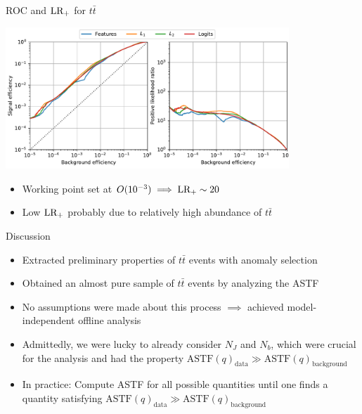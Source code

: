 \documentclass{beamer}
\begin{document}
\begin{frame}{ROC and $\textup{LR}_+$ for $t\bar{t}$}
\begin{center}
\includegraphics[width=0.8\textwidth]{roc-tt.pdf}
\end{center}
\begin{itemize}
    \item<1-> Working point set at $O(10^{-3}) \implies \textup{LR}_+ \sim 20$ 
    \item<2-> Low $\textup{LR}_+$ probably due to relatively high abundance of $t\bar{t}$
\end{itemize}
\end{frame}

\begin{frame}{Discussion}

\begin{itemize}
    \item<1-> Extracted preliminary properties of $t\bar{t}$ events with anomaly selection
    \item<2-> Obtained an almost pure sample of $t\bar{t}$ events by analyzing the ASTF
    \item<3-> No assumptions were made about this process $\implies$ achieved model-independent offline analysis
    \item<4-> Admittedly, we were lucky to already consider $N_J$ and $N_b$, which were crucial for the analysis and had the property $\text{ASTF}(q)_{\text{data}} \gg \text{ASTF}(q)_{\text{background}}$
    \item<5-> In practice: Compute ASTF for all possible quantities until one finds a quantity satisfying $\text{ASTF}(q)_{\text{data}} \gg \text{ASTF}(q)_{\text{background}}$
\end{itemize}
\end{frame}
\end{document}
